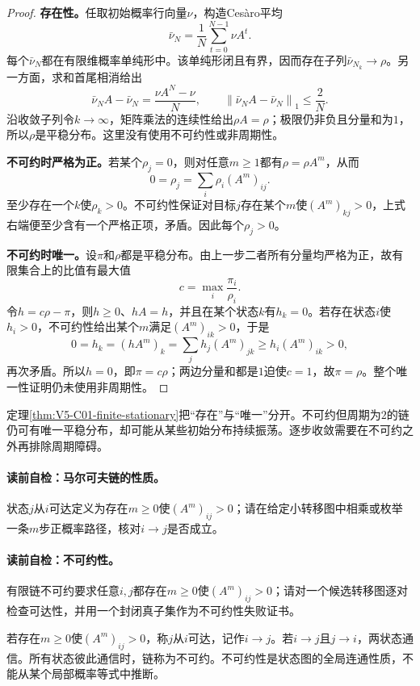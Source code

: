 \begin{proof}
\textbf{存在性。}任取初始概率行向量$\nu$，构造Ces\`aro平均
\[
\bar\nu_N=\frac1N\sum_{t=0}^{N-1}\nu A^t.
\]
每个$\bar\nu_N$都在有限维概率单纯形中。该单纯形闭且有界，因而存在子列$\bar\nu_{N_k}\to\rho$。另一方面，求和首尾相消给出
\[
\bar\nu_NA-\bar\nu_N=\frac{\nu A^N-\nu}{N},
\qquad
\left\|\bar\nu_NA-\bar\nu_N\right\|_1\le\frac2N.
\]
沿收敛子列令$k\to\infty$，矩阵乘法的连续性给出$\rho A=\rho$；极限仍非负且分量和为$1$，所以$\rho$是平稳分布。这里没有使用不可约性或非周期性。

\textbf{不可约时严格为正。}若某个$\rho_j=0$，则对任意$m\ge1$都有$\rho=\rho A^m$，从而
\[
0=\rho_j=\sum_i\rho_i(A^m)_{ij}.
\]
至少存在一个$k$使$\rho_k>0$。不可约性保证对目标$j$存在某个$m$使$(A^m)_{kj}>0$，上式右端便至少含有一个严格正项，矛盾。因此每个$\rho_j>0$。

\textbf{不可约时唯一。}设$\pi$和$\rho$都是平稳分布。由上一步二者所有分量均严格为正，故有限集合上的比值有最大值
\[
c=\max_i\frac{\pi_i}{\rho_i}.
\]
令$h=c\rho-\pi$，则$h\ge0$、$hA=h$，并且在某个状态$k$有$h_k=0$。若存在状态$i$使$h_i>0$，不可约性给出某个$m$满足$(A^m)_{ik}>0$，于是
\[
0=h_k=(hA^m)_k=\sum_jh_j(A^m)_{jk}
\ge h_i(A^m)_{ik}>0,
\]
再次矛盾。所以$h=0$，即$\pi=c\rho$；两边分量和都是$1$迫使$c=1$，故$\pi=\rho$。整个唯一性证明仍未使用非周期性。
\end{proof}
定理\ref{thm:V5-C01-finite-stationary}把“存在”与“唯一”分开。不可约但周期为$2$的链仍可有唯一平稳分布，却可能从某些初始分布持续振荡。逐步收敛需要在不可约之外再排除周期障碍。

\paragraph{读前自检：马尔可夫链的性质。}状态$j$从$i$可达定义为存在$m\ge0$使$(A^m)_{ij}>0$；请在给定小转移图中相乘或枚举一条$m$步正概率路径，核对$i\to j$是否成立。\par
\paragraph{读前自检：不可约性。}有限链不可约要求任意$i,j$都存在$m\ge0$使$(A^m)_{ij}>0$；请对一个候选转移图逐对检查可达性，并用一个封闭真子集作为不可约性失败证书。\par

若存在$m\ge0$使$(A^m)_{ij}>0$，称$j$从$i$可达，记作$i\to j$。若$i\to j$且$j\to i$，两状态通信。所有状态彼此通信时，链称为不可约。不可约性是状态图的全局连通性质，不能从某个局部概率等式中推断。

